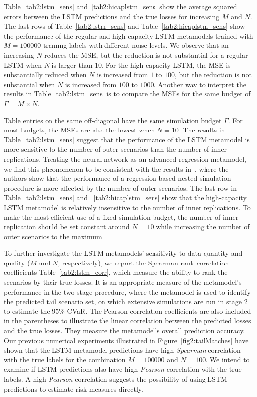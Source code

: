 Table~\ref{tab2:lstm_sens} and~\ref{tab2:hicaplstm_sens} show the average squared errors between the LSTM predictions and the true losses for increasing $M$ and $N$.
The last rows of Table~\ref{tab2:lstm_sens} and Table~\ref{tab2:hicaplstm_sens} show the performance of the regular and high capacity LSTM metamodels trained with $M=\num{100000}$ training labels with different noise levels.
We observe that an increasing $N$ reduces the MSE, but the reduction is not substantial for a regular LSTM when $N$ is larger than $\num{10}$.
For the high-capacity LSTM, the MSE is substantially reduced when $N$ is increased from $\num{1}$ to $\num{100}$, but the reduction is not substantial when $N$ is increased from $\num{100}$ to $\num{1000}$.
Another way to interpret the results in Table~\ref{tab2:lstm_sens} is to compare the MSEs for the same budget of $\Gamma = M \times N$. 

Table entries on the same off-diagonal have the same simulation budget $\Gamma$.
For most budgets, the MSEs are also the lowest when $N = 10$.
The results in Table~\ref{tab2:lstm_sens} suggest that the performance of the LSTM metamodel is more sensitive to the number of outer scenarios than the number of inner replications.
Treating the neural network as an advanced regression metamodel, we find this pheonomenon to be consistent with the results in~\cite{broadie2015risk}, where the authors show that the performance of a regression-based nested simulation procedure is more affected by the number of outer scenarios.
The last row in Table~\ref{tab2:lstm_sens} and ~\ref{tab2:hicaplstm_sens} show that the high-capacity LSTM metamodel is relatively insensitive to the number of inner replications.
To make the most efficient use of a fixed simulation budget, the number of inner replication should be set constant around $N=10$ while increasing the number of outer scenarios to the maximum.

To further investigate the LSTM metamodels' sensitivity to data quantity and quality ($M$ and $N$, respectively), we report the Spearman rank correlation coefficients Table~\ref{tab2:lstm_corr}, which measure the ability to rank the scenarios by their true losses.
It is an appropriate measure of the metamodel's performance in the two-stage procedure, where the metamodel is used to identify the predicted tail scenario set, on which extensive simulations are run in stage 2 to estimate the $95\%$-CVaR.
The Pearson correlation coefficients are also included in the parentheses to illustrate the linear correlation between the predicted losses and the true losses.
They measure the metamodel's overall prediction accuracy.
Our previous numerical experiments illustrated in Figure~\ref{fig2:tailMatches} have shown that the LSTM metamodel predictions have high \textit{Spearman} correlation with the true labels for the combination $M=\num{100000}$ and $N=\num{100}$.
We intend to examine if LSTM predictions also have high \textit{Pearson} correlation with the true labels.
A high \textit{Pearson} correlation suggests the possibility of using LSTM predictions to estimate risk measures directly.

